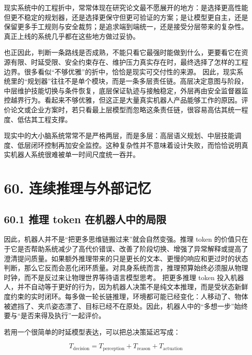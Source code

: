 现实系统中的工程折中，常常体现在研究论文最不愿展开的地方：是选择更高性能但更不稳定的规划器，还是选择更保守但更可验证的方案；是让模型更自主，还是保留更多手工规则与安全裁剪；是追求端到端统一，还是接受分层带来的复杂性。真正上线的系统几乎都在这些地方做过妥协。

也正因此，判断一条路线是否成熟，不能只看它最强时能做到什么，更要看它在资源有限、时延受限、安全约束存在、维护压力真实存在时，最终选择了怎样的工程边界。很多看似“不够优雅”的折中，恰恰是现实可交付性的来源。 因此，现实系统里的“规划器”往往不是单个模块，而是一条多层责任链。高层决定意图与阶段，中层维护技能切换与条件恢复，底层保证轨迹与接触稳定，外层再由安全监督器监控越界行为。看起来不够优雅，但这正是大量真实机器人产品能够工作的原因。评价论文或企业方案时，若只看最上层模型而忽略这条责任链，很容易高估其统一程度、低估其工程支撑。

现实中的大小脑系统常常不是严格两层，而是多层：高层语义规划、中层技能调度、低层闭环控制再加安全监控。这种复杂性并不意味着设计失败，而恰恰说明真实机器人系统很难被单一时间尺度统一吞并。

\section*{60. 连续推理与外部记忆}

\subsection*{60.1 推理 token 在机器人中的局限}


因此，机器人并不是“把更多思维链搬过来”就会自然变强。推理 token 的价值只在于它是否帮助系统减少了高代价错误、改善了阶段切换、增强了异常解释或提高了澄清提问质量。如果额外推理带来的只是更长的文本、更慢的响应和更过时的状态判断，那么它反而会恶化闭环质量。对具身系统而言，推理预算始终必须服从物理时钟，而不是反过来让物理世界等待语言模型思考。 把更多推理 token 投入机器人，并不自动等于更好的行为，因为机器人决策不是纯文本推理，而是受状态新鲜度约束的实时闭环。每多做一轮长链推理，环境都可能已经变化：人移动了、物体被遮挡了、夹爪姿态漂了、目标已经不在原处。因此，机器人中的“多想一步”始终要与“是否来得及执行”一起评价。

若用一个很简单的时延模型表达，可以把总决策延迟写成：

\begingroup
\footnotesize
\begin{equation*}
T_{\text{decision}} = T_{\text{perception}} + T_{\text{reason}} + T_{\text{actuation}}
\end{equation*}
\endgroup

